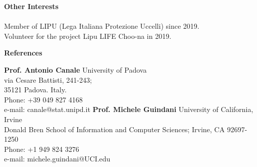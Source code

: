 \documentclass[10pt]{amsart}
\begin{document}
	 
	 

 

	{\large {\bf Other Interests}} \\[-.08cm]%
	\underline{\hspace{6in}} \\[.2cm] 
	Member of LIPU (Lega Italiana Protezione Uccelli) since 2019.\\
	Volunteer for the project Lipu LIFE Choo-na in 2019.
	\newline \newline


	{\large {\bf References}} \\[-.08cm]%
	\underline{\hspace{6in}} 
	\begin{multicols}{2}

	{\bf Prof. Antonio Canale}\newline
	University of Padova\\
	via Cesare Battisti, 241-243; \\
	35121 Padova. Italy.\\
	Phone: +39 049 827 4168\\
	e-mail: canale@stat.unipd.it  
	\newline\newline
	{\bf Prof. Michele Guindani}\newline
	University of California, Irvine\\
	Donald Bren School of Information and Computer Sciences;
	Irvine, CA 92697-1250\\
	Phone: +1 949 824 3276\\
	e-mail: michele.guindani@UCI.edu
	 		\end{multicols}
\end{document}
